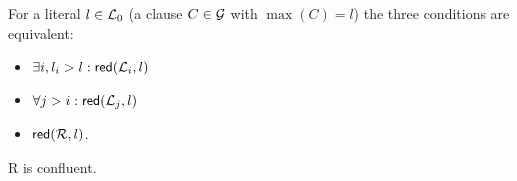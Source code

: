  \begin{LEMMA} \label{le:redundancy-limitNG}
For a literal $l\in\mbox {$\cal L$}_0$ (a clause $C\in \mbox {$\cal G$}$ with \(\max(C)=l\)) the three
conditions are equivalent: 
\begin{itemize}\MyLPar
\item $\exists i, l_i>l : \mbox{\sf red}(\mbox {$\cal L$}_i,l)$
\item $\forall j>i: \mbox{\sf red}(\mbox {$\cal L$}_j,l)$
\item $\mbox{\sf red}(\mbox {$\cal R$},l)$.
\end{itemize}
\end{LEMMA}

 \begin{LEMMA} \label{le:model-confluent}
\C R is confluent.
\end{LEMMA}

